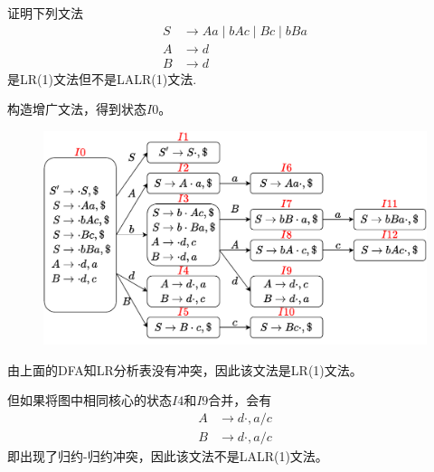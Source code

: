 \documentclass[logo,reportComp]{thesis}
\begin{document}
\begin{question}
证明下列文法
\[\begin{aligned}
S &\to Aa \mid bAc \mid Bc \mid bBa\\
A &\to d\\
B &\to d
\end{aligned}\]
是LR(1)文法但不是LALR(1)文法.
\end{question}
\begin{answer}
构造增广文法，得到状态$I0$。
\begin{figure}[H]
\centering
\includegraphics[width=\linewidth]{fig/T07-2.pdf}
\end{figure}
由上面的DFA知LR分析表没有冲突，因此该文法是LR(1)文法。

但如果将图中相同核心的状态$I4$和$I9$合并，会有
\[\begin{aligned}
A &\to d\cdot,a/c\\
B &\to d\cdot,a/c
\end{aligned}\]
即出现了归约-归约冲突，因此该文法不是LALR(1)文法。
\end{answer}
\end{document}
